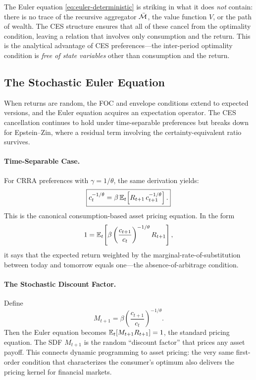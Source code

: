 \begin{calloutimportant}
The Euler equation \cref{eq:euler-deterministic} is striking in what it does \emph{not} contain: there is no trace of the recursive aggregator $\bar{\mathcal{M}}$, the value function $V$, or the path of wealth. The CES structure ensures that all of these cancel from the optimality condition, leaving a relation that involves only consumption and the return. This is the analytical advantage of CES preferences---the inter-period optimality condition is \emph{free of state variables} other than consumption and the return.
\end{calloutimportant}

\subsection{The Stochastic Euler Equation}
\label{subsec:dp-stochastic-euler}

When returns are random, the FOC and envelope conditions extend to expected versions, and the Euler equation acquires an expectation operator. The CES cancellation continues to hold under time-separable preferences but breaks down for Epstein--Zin, where a residual term involving the certainty-equivalent ratio survives.

\paragraph{Time-Separable Case.}
For CRRA preferences with $\gamma = 1/\theta$, the same derivation yields:
\begin{equation}
\boxed{c_t^{-1/\theta} = \beta \, \mathbb{E}_t\!\left[ R_{t+1} \, c_{t+1}^{-1/\theta} \right].}
\label{eq:euler-crra-stochastic}
\end{equation}
This is the canonical consumption-based asset pricing equation. In the form
\begin{equation}
1 = \mathbb{E}_t\!\left[ \beta \left(\frac{c_{t+1}}{c_t}\right)^{-1/\theta} R_{t+1} \right],
\label{eq:euler-asset-pricing}
\end{equation}
it says that the expected return weighted by the marginal-rate-of-substitution between today and tomorrow equals one---the absence-of-arbitrage condition.

\paragraph{The Stochastic Discount Factor.}
Define
\begin{equation}
M_{t+1} = \beta \left( \frac{c_{t+1}}{c_t} \right)^{-1/\theta}.
\label{eq:sdf-crra}
\end{equation}
Then the Euler equation becomes $\mathbb{E}_t[M_{t+1} R_{t+1}] = 1$, the standard pricing equation. The SDF $M_{t+1}$ is the random ``discount factor'' that prices any asset payoff. This connects dynamic programming to asset pricing: the very same first-order condition that characterizes the consumer's optimum also delivers the pricing kernel for financial markets.

